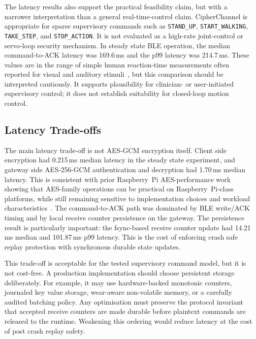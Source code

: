 \documentclass[journal]{IEEEtran}
\begin{document}
The latency results also support the practical feasibility claim, but with a narrower interpretation than a general real-time-control claim. CipherChannel is appropriate for sparse supervisory commands such as \texttt{STAND\_UP}, \texttt{START\_WALKING}, \texttt{TAKE\_STEP}, and \texttt{STOP\_ACTION}. It is not evaluated as a high-rate joint-control or servo-loop security mechanism. In steady state BLE operation, the median command-to-ACK latency was 169.6\,ms and the p99 latency was 214.7\,ms. These values are in the range of simple human reaction-time measurements often reported for visual and auditory stimuli~\cite{kosinski2013reaction}, but this comparison should be interpreted cautiously. It supports plausibility for clinician- or user-initiated supervisory control; it does not establish suitability for closed-loop motion control.

\subsection{Latency Trade-offs}

The main latency trade-off is not AES-GCM encryption itself. Client side encryption had 0.215\,ms median latency in the steady state experiment, and gateway side AES-256-GCM authentication and decryption had 1.70\,ms median latency. This is consistent with prior Raspberry~Pi AES-performance work showing that AES-family operations can be practical on Raspberry~Pi-class platforms, while still remaining sensitive to implementation choices and workload characteristics~\cite{riddle2023aespie}. The command-to-ACK path was dominated by BLE write/ACK timing and by local receive counter persistence on the gateway. The persistence result is particularly important: the fsync-based receive counter update had 14.21\,ms median and 101.87\,ms p99 latency. This is the cost of enforcing crash safe  replay protection with synchronous durable state updates.

This trade-off is acceptable for the tested supervisory command model, but it is not cost-free. A production implementation should choose persistent storage deliberately. For example, it may use hardware-backed monotonic counters, journaled key value storage, wear-aware non-volatile memory, or a carefully audited batching policy. Any optimisation must preserve the protocol invariant that accepted receive counters are made durable before plaintext commands are released to the runtime. Weakening this ordering would reduce latency at the cost of post crash replay safety.
\end{document}
